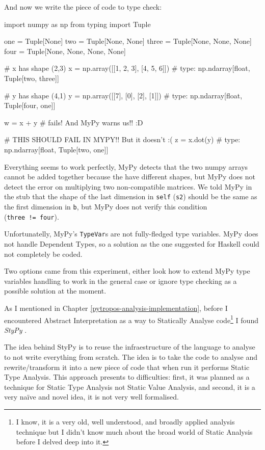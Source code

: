 And now we write the piece of code to type check:

\begin{pythoncode}
import numpy as np
from typing import Tuple

one   = Tuple[None]
two   = Tuple[None, None]
three = Tuple[None, None, None]
four  = Tuple[None, None, None, None]

# x has shape (2,3)
x = np.array([[1, 2, 3], [4, 5, 6]])  # type: np.ndarray[float, Tuple[two, three]]

# y has shape (4,1)
y = np.array([[7], [0], [2], [1]])    # type: np.ndarray[float, Tuple[four, one]]

w = x + y  # fails! And MyPy warns us!! :D

# THIS SHOULD FAIL IN MYPY!! But it doesn't :(
z = x.dot(y)  # type: np.ndarray[float, Tuple[two, one]]
\end{pythoncode}

Everything seems to work perfectly, MyPy detects that the two numpy
arrays cannot be added together because the have different shapes, but
MyPy does not detect the error on multiplying two non-compatible
matrices. We told MyPy in the stub that the shape of the last dimension
in \texttt{self} (\texttt{s2}) should be the same as the first dimension
in \texttt{b}, but MyPy does not verify this condition
(\texttt{three\ !=\ four}).

Unfortunatelly, MyPy's \texttt{TypeVar}s are not fully-fledged type
variables. MyPy does not handle Dependent Types, so a solution as the
one suggested for Haskell could not completely be coded.

Two options came from this experiment, either look how to extend MyPy
type variables handling to work in the general case or ignore type
checking as a possible solution at the moment.

{}

As I mentioned in Chapter \ref{pytropos-analysis-implementation}, before
I encountered Abstract Interpretation as a way to Statically Analyse
code\footnote{I know, it is a very old, well understood, and broadly
  applied analysis technique but I didn't know much about the broad
  world of Static Analysis before I delved deep into it.} I found
\emph{StyPy} \autocite{ortin_towards_2015}.

The idea behind StyPy is to reuse the infraestructure of the language to
analyse to not write everything from scratch. The idea is to take the
code to analyse and rewrite/transform it into a new piece of code that
when run it performs Static Type Analysis. This approach presents to
difficulties: first, it was planned as a technique for Static Type
Analysis not Static Value Analysis, and second, it is a very naïve and
novel idea, it is not very well formalised.

